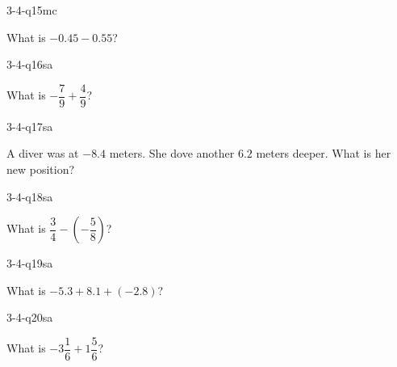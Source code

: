 \begin{practiceQuestion}{3-4-q15}{mc}
\begin{questionText}
What is $-0.45 - 0.55$?
\end{questionText}
\end{practiceQuestion}


\begin{practiceQuestion}{3-4-q16}{sa}
\begin{questionText}
What is $-\dfrac{7}{9} + \dfrac{4}{9}$?
\end{questionText}
\end{practiceQuestion}

\begin{practiceQuestion}{3-4-q17}{sa}
\begin{questionText}
A diver was at $-8.4$ meters. She dove another $6.2$ meters deeper. What is her new position?
\end{questionText}
\end{practiceQuestion}

\begin{practiceQuestion}{3-4-q18}{sa}
\begin{questionText}
What is $\dfrac{3}{4} - \left(-\dfrac{5}{8}\right)$?
\end{questionText}
\end{practiceQuestion}

\begin{practiceQuestion}{3-4-q19}{sa}
\begin{questionText}
What is $-5.3 + 8.1 + (-2.8)$?
\end{questionText}
\end{practiceQuestion}

\begin{practiceQuestion}{3-4-q20}{sa}
\begin{questionText}
What is $-3\dfrac{1}{6} + 1\dfrac{5}{6}$?
\end{questionText}
\end{practiceQuestion}

